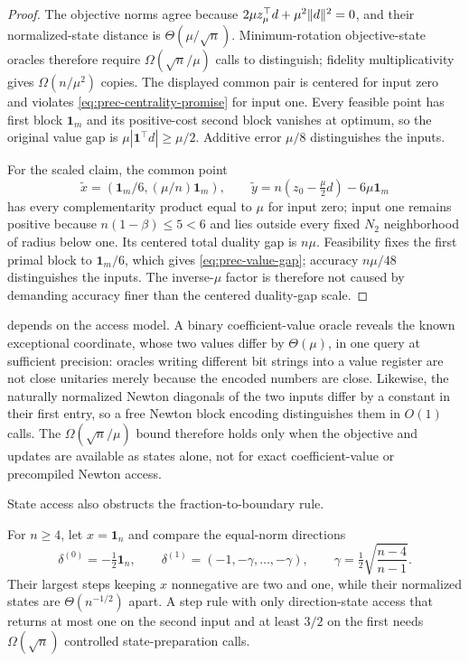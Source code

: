 \begin{proof}
The objective norms agree because
$2\mu z_\mu^\top d+\mu^2\lVert d\rVert^2=0$, and their normalized-state distance is
$\Theta(\mu/\sqrt n)$.  Minimum-rotation objective-state oracles therefore
require $\Omega(\sqrt n/\mu)$ calls to distinguish; fidelity
multiplicativity gives $\Omega(n/\mu^2)$ copies.  The displayed common pair
is centered for input zero and violates \eqref{eq:prec-centrality-promise}
for input one.  Every feasible point has first block $\mathbf1_m$ and its
positive-cost second block vanishes at optimum, so the original value gap is
$\mu|\mathbf1^\top d|\geq\mu/2$.  Additive error $\mu/8$ distinguishes the
inputs.

For the scaled claim, the common point
\[
 \widetilde x=(\mathbf1_m/6,(\mu/n)\mathbf1_m),\qquad
 \widetilde y=n(z_0-\tfrac\mu2d)-6\mu\mathbf1_m
\]
has every complementarity product equal to $\mu$ for input zero; input one
remains positive because $n(1-\beta)\leq5<6$ and lies outside every fixed
$N_2$ neighborhood of radius below one.  Its centered total duality gap is
$n\mu$.  Feasibility fixes the first primal block to $\mathbf1_m/6$, which
gives \eqref{eq:prec-value-gap}; accuracy $n\mu/48$ distinguishes the inputs.
The inverse-$\mu$ factor is therefore not caused by demanding accuracy finer
than the centered duality-gap scale.
\end{proof}

 depends on the access model.  A binary
coefficient-value oracle reveals the known exceptional coordinate, whose two
values differ by $\Theta(\mu)$, in one query at sufficient precision:
oracles writing different bit strings into a value register are not close
unitaries merely because the encoded numbers are close.  Likewise, the
naturally normalized Newton diagonals of the two inputs differ by a constant
in their first entry, so a free Newton block encoding distinguishes them in
$O(1)$ calls.  The $\Omega(\sqrt n/\mu)$ bound therefore holds only when the
objective and updates are available as states alone, not for exact
coefficient-value or precompiled Newton access.

State access also obstructs the fraction-to-boundary rule.

\begin{corollary}
\label{cor:prec-fraction-boundary}
For $n\geq4$, let $x=\mathbf1_n$ and compare the equal-norm directions
\[
 \delta^{(0)}=-\tfrac12\mathbf1_n,\qquad
 \delta^{(1)}=(-1,-\gamma,\ldots,-\gamma),\qquad
 \gamma=\tfrac12\sqrt{\frac{n-4}{n-1}}.
\]
Their largest steps keeping $x$ nonnegative are two and one, while their
normalized states are $\Theta(n^{-1/2})$ apart.  A step rule with only
direction-state access that returns at most one on the second input and at
least $3/2$ on the first needs $\Omega(\sqrt n)$ controlled
state-preparation calls.
\end{corollary}

